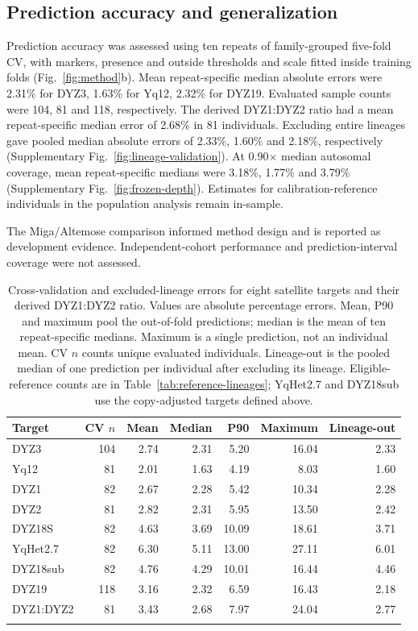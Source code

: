\documentclass[pdflatex,sn-nature]{sn-jnl}
\newif\ifdraftnotes
\newcommand{\draftnote}[1]{\ifdraftnotes\par\smallskip{\noindent\color{draftink}\small\textbf{Author query:} #1\par}\smallskip\fi}
\begin{document}
\draftnote{Record the model and software versions and compressed model size in the release manifest.}

\subsection{Prediction accuracy and generalization}\label{sec:res-benchmark}
Prediction accuracy was assessed using ten repeats of family-grouped five-fold CV, with markers, presence and outside thresholds and scale fitted inside training folds (Fig.~\ref{fig:method}b). Mean repeat-specific median absolute errors were 2.31\% for DYZ3, 1.63\% for Yq12, 2.32\% for DYZ19. Evaluated sample counts were 104, 81 and 118, respectively. The derived DYZ1:DYZ2 ratio had a mean repeat-specific median error of 2.68\% in 81 individuals. Excluding entire lineages gave pooled median absolute errors of 2.33\%, 1.60\% and 2.18\%, respectively (Supplementary Fig.~\ref{fig:lineage-validation}). At 0.90$\times$ median autosomal coverage, mean repeat-specific medians were 3.18\%, 1.77\% and 3.79\% (Supplementary Fig.~\ref{fig:frozen-depth}). Estimates for calibration-reference individuals in the population analysis remain in-sample.

The Miga/Altemose comparison informed method design \cite{Miga2014,Altemose2014} and is reported as development evidence. Independent-cohort performance and prediction-interval coverage were not assessed.

\begin{table}[tbp]
\caption{Cross-validation and excluded-lineage errors for eight satellite targets and their derived DYZ1:DYZ2 ratio. Values are absolute percentage errors. Mean, P90 and maximum pool the out-of-fold predictions; median is the mean of ten repeat-specific medians. Maximum is a single prediction, not an individual mean. CV $n$ counts unique evaluated individuals. Lineage-out is the pooled median of one prediction per individual after excluding its lineage. Eligible-reference counts are in Table~\ref{tab:reference-lineages}; YqHet2.7 and DYZ18sub use the copy-adjusted targets defined above.}\label{tab:accuracy}
\centering\small
\begin{tabular}{lrrrrrr}
\toprule
Target & CV $n$ & Mean & Median & P90 & Maximum & Lineage-out \\
\midrule
DYZ3 & 104 & 2.74 & 2.31 & 5.20 & 16.04 & 2.33 \\
Yq12 & 81 & 2.01 & 1.63 & 4.19 & 8.03 & 1.60 \\
DYZ1 & 82 & 2.67 & 2.28 & 5.42 & 10.34 & 2.28 \\
DYZ2 & 81 & 2.82 & 2.31 & 5.95 & 13.50 & 2.42 \\
DYZ18S & 82 & 4.63 & 3.69 & 10.09 & 18.61 & 3.71 \\
YqHet2.7 & 82 & 6.30 & 5.11 & 13.00 & 27.11 & 6.01 \\
DYZ18sub & 82 & 4.76 & 4.29 & 10.01 & 16.44 & 4.46 \\
DYZ19 & 118 & 3.16 & 2.32 & 6.59 & 16.43 & 2.18 \\
DYZ1:DYZ2 & 81 & 3.43 & 2.68 & 7.97 & 24.04 & 2.77 \\
\botrule
\end{tabular}
\end{table}
\end{document}
